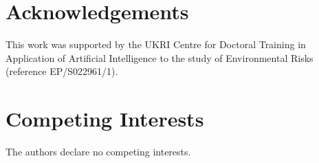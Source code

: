 \documentclass[11pt]{article}
\begin{document}
\section*{Acknowledgements}

This work was supported by the UKRI Centre for Doctoral Training in Application of Artificial Intelligence to the study of Environmental Risks (reference EP/S022961/1).

\section*{Competing Interests}

The authors declare no competing interests.



\end{document}

